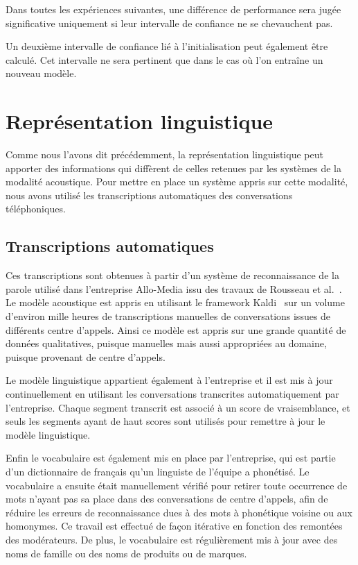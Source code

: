 Dans toutes les expériences suivantes, une différence de performance sera jugée significative uniquement si leur intervalle de confiance ne se chevauchent pas.

Un deuxième intervalle de confiance lié à l'initialisation peut également être calculé. Cet intervalle ne sera pertinent que dans le cas où l'on entraîne un nouveau modèle.

\section{Représentation linguistique}
Comme nous l'avons dit précédemment, la représentation linguistique peut apporter des informations qui diffèrent de celles retenues par les systèmes de la modalité acoustique. Pour mettre en place un système appris sur cette modalité, nous avons utilisé les transcriptions automatiques des conversations téléphoniques.

\subsection{Transcriptions automatiques}
Ces transcriptions sont obtenues à partir d'un système de reconnaissance de la parole utilisé dans l'entreprise Allo-Media issu des travaux de Rousseau et al.~\cite{Rousseau2014}. Le modèle acoustique est appris en utilisant le framework Kaldi~\cite{Povey2011} sur un volume d'environ mille heures de transcriptions manuelles de conversations issues de différents centre d'appels. Ainsi ce modèle est appris sur une grande quantité de données qualitatives, puisque manuelles mais aussi appropriées au domaine, puisque provenant de centre d'appels.

Le modèle linguistique appartient également à l'entreprise et il est mis à jour continuellement en utilisant les conversations transcrites automatiquement par l'entreprise. Chaque segment transcrit est associé à un score de vraisemblance, et seuls les segments ayant de haut scores sont utilisés pour remettre à jour le modèle linguistique.

Enfin le vocabulaire est également mis en place par l'entreprise, qui est partie d'un dictionnaire de français qu'un linguiste de l'équipe a phonétisé. Le vocabulaire a ensuite était manuellement vérifié pour retirer toute occurrence de mots n'ayant pas sa place dans des conversations de centre d'appels, afin de réduire les erreurs de reconnaissance dues à des mots à phonétique voisine ou aux homonymes. Ce travail est effectué de façon itérative en fonction des remontées des modérateurs. De plus, le vocabulaire est régulièrement mis à jour avec des noms de famille ou des noms de produits ou de marques.

